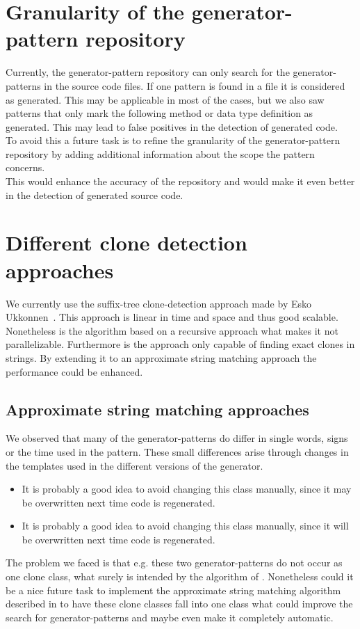 \section{Granularity of the generator-pattern repository}
Currently, the generator-pattern repository can only search for the generator-patterns in the source code files. If one pattern is found in a file it is considered as generated. This may be applicable in most of the cases, but we also saw patterns that only mark the following method or data type definition as generated. This may lead to false positives in the detection of generated code.\\
To avoid this a future task is to refine the granularity of the generator-pattern repository by adding additional information about the scope the pattern concerns. \\
This would enhance the accuracy of the repository and would make it even better in the detection of generated source code.

\section{Different clone detection approaches}
We currently use the suffix-tree clone-detection approach made by Esko Ukkonnen~\cite{Ukkonen1995}. This approach is linear in time and space and thus good scalable.\\
Nonetheless is the algorithm based on a recursive approach what makes it not parallelizable. Furthermore is the approach only capable of finding exact clones in strings. By extending it to an approximate string matching approach the performance could be enhanced.

\subsection{Approximate string matching approaches}
We observed that many of the generator-patterns do differ in single words, signs or the time used in the pattern. These small differences arise through changes in the templates used in the different versions of the generator. 
\begin{itemize}
	\item It is probably a good idea to avoid changing this class manually, since it \textcolor{TUMAccentOrange}{may} be overwritten next time code is regenerated.
	\item It is probably a good idea to avoid changing this class manually, since it \textcolor{TUMAccentOrange}{will} be overwritten next time code is regenerated.
\end{itemize}
The problem we faced is that e.g. these two generator-patterns do not occur as one clone class, what surely is intended by the algorithm of \cite{Ukkonen1995}. Nonetheless could it be a nice future task to implement the approximate string matching algorithm described in \cite{Ukkonen1993} to have these clone classes fall into one class what could improve the search for generator-patterns and maybe even make it completely automatic.

